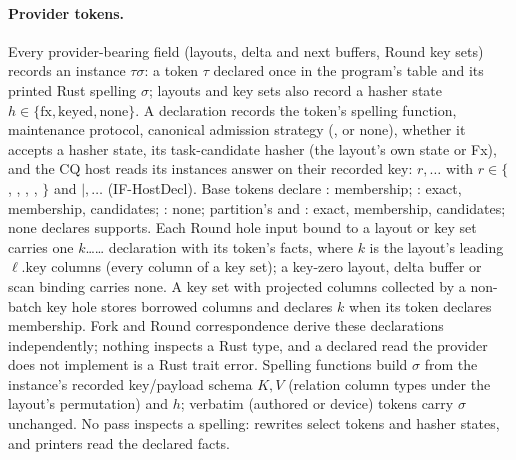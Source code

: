 \paragraph{Provider tokens.} Every provider-bearing field (layouts, delta and
next buffers, Round key sets) records an instance $\tau$$\sigma$:
a token $\tau$ declared once in the program's  table and its
printed Rust spelling $\sigma$; layouts and key sets also record a hasher state
$h\in\{\mathrm{fx},\mathrm{keyed},\mathrm{none}\}$. A declaration records the
token's spelling function, maintenance protocol, canonical admission strategy
(,  or none), whether it accepts a
hasher state, its task-candidate hasher (the layout's own state or Fx), and
the CQ host reads its instances answer on their recorded key:
\code{reads \{[}$r,\ldots$\code{]\}} with $r\in\{$,
, , , $\}$ and
\code{supports \{[}$\mid$$,\ldots$\code{]\}} (IF-HostDecl).
Base tokens declare : membership; : exact,
membership, candidates; : none; partition's
 and : exact, membership, candidates;
none declares supports. Each Round hole input bound to a layout or key set
carries one \code{host [}$k$\code{] reads [}\ldots\code{] supports [}\ldots\code{]}
declaration with its token's facts, where $k$ is the layout's leading
$\ell.\mathrm{key}$ columns (every column of a key set); a key-zero layout,
delta buffer or scan binding carries none. A key set with projected columns
collected by a non-batch key hole stores borrowed columns and declares
\code{host [}$k$\code{] borrowed reads [membership]} when its token declares
membership. Fork and Round correspondence derive
these declarations independently; nothing inspects a Rust type, and a
declared read the provider does not implement is a Rust trait error.
Spelling functions build $\sigma$ from the instance's recorded key/payload
schema $K,V$ (relation column types under the layout's permutation) and $h$;
verbatim (authored or device) tokens carry $\sigma$ unchanged. No pass inspects
a spelling: rewrites select tokens and hasher states, and printers read the
declared facts.
